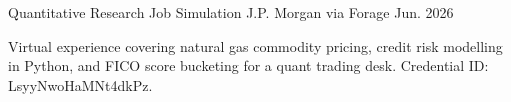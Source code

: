 

\begin{cventries}

  \cventry
    {Quantitative Research Job Simulation} %
    {J.P. Morgan via Forage} %
    {} %
    {Jun. 2026} %
    {
      \begin{cvitems}
        \item {Virtual experience covering natural gas commodity pricing, credit risk modelling in Python, and FICO score bucketing for a quant trading desk. Credential ID: LsyyNwoHaMNt4dkPz.}
      \end{cvitems}
    }

\end{cventries}
